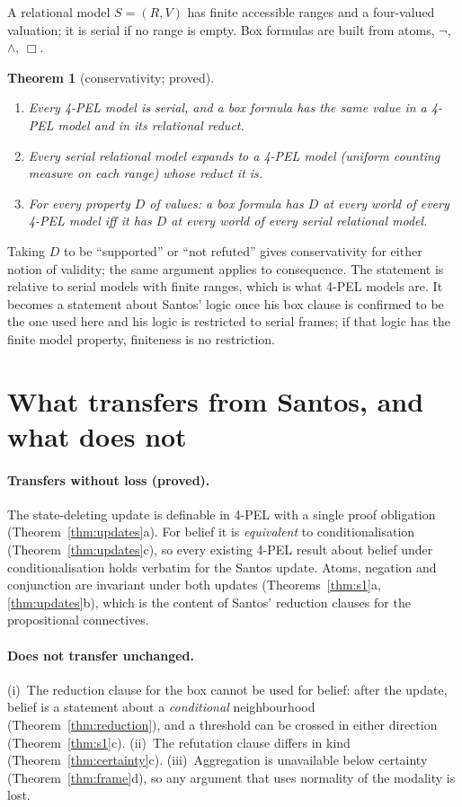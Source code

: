 \documentclass[11pt,a4paper]{article}
\newtheorem{theorem}{Theorem}[section]
\theoremstyle{definition}
\theoremstyle{remark}
\begin{document}
A relational model $S=(R,V)$ has finite accessible ranges and a four-valued valuation; it
is serial if no range is empty. Box formulas are built from atoms, $\neg$, $\wedge$, $\Box$.

\begin{theorem}[conservativity; proved]\label{thm:cons}
\begin{enumerate}[label=(\alph*),nosep]
\item Every 4-PEL model is serial, and a box formula has the same value in a 4-PEL model
and in its relational reduct.
\item Every serial relational model expands to a 4-PEL model (uniform counting measure on
each range) whose reduct it is.
\item For every property $D$ of values: a box formula has $D$ at every world of every
4-PEL model iff it has $D$ at every world of every serial relational model.
\end{enumerate}
\end{theorem}

Taking $D$ to be ``supported'' or ``not refuted'' gives conservativity for either notion
of validity; the same argument applies to consequence. The statement is relative to
serial models with finite ranges, which is what 4-PEL models are. It becomes a statement
about Santos' logic once his box clause is confirmed to be the one used here and his logic
is restricted to serial frames; if that logic has the finite model property, finiteness is
no restriction.

\section{What transfers from Santos, and what does not}\label{sec:transfer}

\paragraph{Transfers without loss (proved).}
The state-deleting update is definable in 4-PEL with a single proof obligation
(Theorem~\ref{thm:updates}a). For belief it is \emph{equivalent} to conditionalisation
(Theorem~\ref{thm:updates}c), so every existing 4-PEL result about belief under
conditionalisation holds verbatim for the Santos update. Atoms, negation and conjunction
are invariant under both updates (Theorems~\ref{thm:s1}a, \ref{thm:updates}b), which is
the content of Santos' reduction clauses for the propositional connectives.

\paragraph{Does not transfer unchanged.}
(i)~The reduction clause for the box cannot be used for belief: after the update, belief
is a statement about a \emph{conditional} neighbourhood (Theorem~\ref{thm:reduction}), and
a threshold can be crossed in either direction (Theorem~\ref{thm:s1}c).
(ii)~The refutation clause differs in kind (Theorem~\ref{thm:certainty}c).
(iii)~Aggregation is unavailable below certainty (Theorem~\ref{thm:frame}d), so any
argument that uses normality of the modality is lost.
\end{document}
